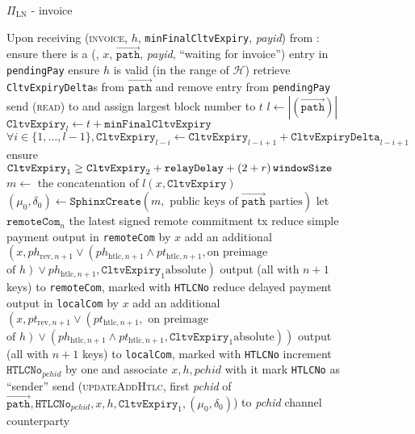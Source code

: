 \begin{figure}[H]
\begin{protocolbox}{$\Pi_{\mathrm{LN}}$ - invoice}
\begin{algorithmic}[1]
        \State Upon receiving (\textsc{invoice}, $h$,
        \texttt{minFinalCltvExpiry}, \textit{payid}) from \bob:
        \Indent
          \State ensure there is a (\bob, $x$, $\overrightarrow{\mathtt{path}}$,
          \textit{payid}, ``waiting for invoice'') entry in \texttt{pendingPay}
          \State ensure $h$ is valid (in the range of $\mathcal{H}$)
          \State retrieve \texttt{CltvExpiryDelta}s from
          $\overrightarrow{\mathtt{path}}$ and remove entry from
          \texttt{pendingPay}
          \State send (\textsc{read}) to \ledger{} and assign largest block
          number to $t$
          \State $l \gets |\left(\overrightarrow{\mathtt{path}}\right)|$
          \State $\mathtt{CltvExpiry}_l \gets t + \mathtt{minFinalCltvExpiry}$
          \State $\forall i \in \{1, \dots, l - 1\}, \mathtt{CltvExpiry}_{l - i}
          \gets \mathtt{CltvExpiry}_{l - i + 1} + \mathtt{CltvExpiryDelta}_{l -
          i + 1}$
          \label{alg:protocol:pay:invoice:cltv}
          \State ensure $\mathtt{CltvExpiry}_1 \geq \mathtt{CltvExpiry}_2 +
          \mathtt{relayDelay} + \left(2 + r\right)\texttt{windowSize}$
          \State $m \gets$ the concatenation of $l \left(x,
          \mathtt{CltvExpiry}\right)$
          \State $\left(\mu_0, \delta_0\right) \gets
          \mathtt{SphinxCreate}\left(m, \text{ public keys of }
          \overrightarrow{\mathtt{path}} \text{ parties}\right)$
          \State let $\mathtt{remoteCom}_n$ the latest signed remote commitment
          tx
          \State reduce simple payment output in \texttt{remoteCom} by $x$
          \State add an additional $\left(x, ph_{\mathrm{rev}, n+1} \vee
          \left(ph_{\mathrm{htlc}, n+1} \wedge pt_{\mathrm{htlc}, n+1}, \text{
          on preimage}\right.\right.$ $\left.\left.\text{of } h\right) \vee
          ph_{\mathrm{htlc}, n+1}, \mathtt{CltvExpiry}_1 \text{
          absolute}\right)$
          output (all with $n+1$ keys) to \texttt{remoteCom}, marked with
          \texttt{HTLCNo}
          \State reduce delayed payment output in \texttt{localCom} by $x$
          \State add an additional $\left(x, pt_{\mathrm{rev}, n+1} \vee
          \left(pt_{\mathrm{htlc}, n+1}, \text{ on preimage}\right.\right.$
          $\left.\left.\text{of } h\right) \vee \left(ph_{\mathrm{htlc}, n+1}
          \wedge pt_{\mathrm{htlc}, n+1}, \mathtt{CltvExpiry}_1 \text{
          absolute}\right)\right)$ output (all with $n+1$ keys) to
          \texttt{localCom}, marked with \texttt{HTLCNo}
          \State increment $\mathtt{HTLCNo}_{\mathit{pchid}}$ by one and
          associate $x, h, \mathit{pchid}$ with it
          \State mark \texttt{HTLCNo} as ``sender''
          \State send (\textsc{updateAddHtlc}, first \textit{pchid} of
          $\overrightarrow{\mathtt{path}}, \mathtt{HTLCNo}_{\mathit{pchid}}, x,
          h, \mathtt{CltvExpiry}_1, \left(\mu_0, \delta_0\right)$) to
          \textit{pchid} channel counterparty
        \EndIndent
      \end{algorithmic}
    \end{protocolbox}
    \caption{}
    \label{alg:protocol:pay:invoice}
  \end{figure}

